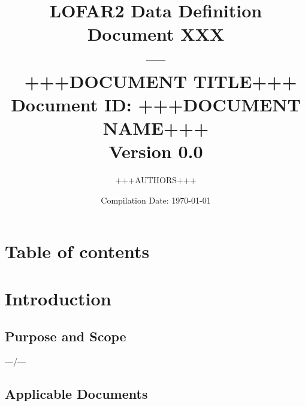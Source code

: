 \documentclass[a4paper,10pt,bibtotoc]{scrartcl}
\begin{document}

\title{LOFAR2 Data Definition Document XXX \\ --- \\\ +++DOCUMENT TITLE+++ \\
{\normalsize Document ID: +++DOCUMENT NAME+++} \\ 
{\normalsize Version 0.0} \\
}
\author{+++AUTHORS+++}
\date{\small{Compilation Date: \today}}
\maketitle

\section{Table of contents}
\tableofcontents

\listoffigures

\listoftables

\clearpage




\section{Introduction}
\label{sec:introduction}

\subsection{Purpose and Scope}
\label{sec:purpose and scope}

---/---

\subsection{Applicable Documents}


\end{document}
